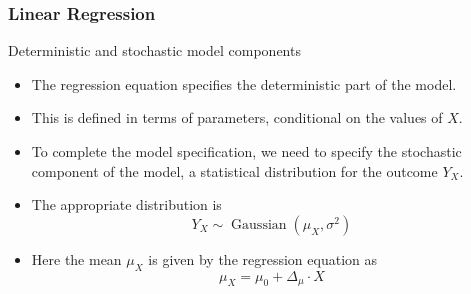 \documentclass[10pt]{beamer}\usepackage[]{graphicx}\usepackage[]{color}
\begin{document}
\subsubsection{Linear Regression}
\begin{frame}{Deterministic and stochastic model components}
	\begin{itemize}
		\item 
		The regression equation specifies the deterministic part of the model.
		
		\item This is defined in terms of parameters, conditional on the values of $X$.
		
		\item To complete the model specification, we need to specify the stochastic component of the model, a statistical distribution for the outcome $Y_{X}$. 
		\item The appropriate distribution is
		$$
		Y_{X} \sim \operatorname{Gaussian}\left(\mu_{X}, \sigma^2\right)
		$$
		\item Here the mean $\mu_{X}$ is given by the regression equation as 
		$$
		\mu_{X}=\mu_0 + \Delta_{\mu} \cdot X
		$$
	\end{itemize}
\end{frame}
\end{document}
